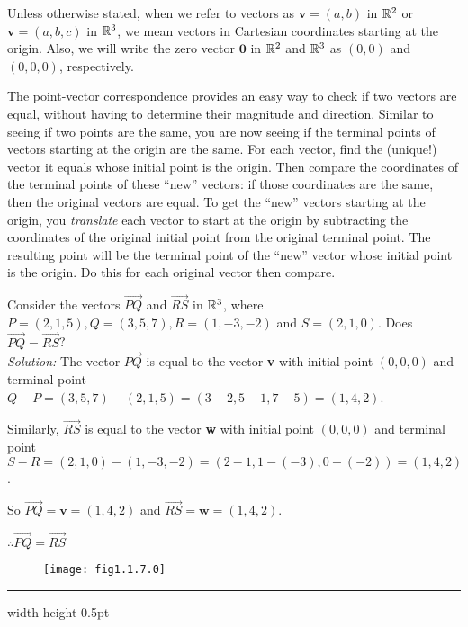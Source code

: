 Unless otherwise stated, when we refer to vectors as $\textbf{v} = (a,b)$ in $\mathbb{R}^{2}$ or $\textbf{v} = (a,b,c)$
in $\mathbb{R}^{3}$, we mean vectors in Cartesian coordinates starting at the origin.  Also, we will write
the zero vector $\textbf{0}$ in $\mathbb{R}^{2}$ and $\mathbb{R}^{3}$ as $(0,0)$ and $(0,0,0)$, respectively.

The point-vector correspondence provides an easy way to check if two vectors are
equal, without having to determine their magnitude and direction.  Similar to seeing if two points are the same, you are
now seeing if the terminal points of vectors starting at the origin are the same.  For each vector, find the
(unique!) vector it equals whose initial point is the origin.  Then compare the coordinates of the terminal points of
these ``new'' vectors: if those coordinates are the same, then the original vectors are equal.  To get the ``new''
vectors starting at the origin, you \emph{translate}
each vector to start at the origin by subtracting the coordinates of the original
initial point from the original terminal point.  The resulting point will be the terminal point of
the ``new'' vector whose initial point is the origin.  Do this for each original vector then compare.

\begin{exmp}
 Consider the vectors $\overrightarrow{PQ}$ and $\overrightarrow{RS}$ in $\mathbb{R}^{3}$, where $P = (2,1,5),
 Q = (3,5,7), R = (1,-3,-2)$ and $S = (2,1,0)$.  Does $\overrightarrow{PQ} =
 \overrightarrow{RS}$?\\\emph{Solution:}
 The vector $\overrightarrow{PQ}$ is equal to the vector \textbf{v} with
 initial point $(0,0,0)$ and terminal point $Q - P = (3,5,7) - (2,1,5) = (3 - 2,5 - 1,7 - 5) = (1,4,2)$.
 \par\noindent
 Similarly, $\overrightarrow{RS}$ is equal to the vector \textbf{w} with
 initial point $(0,0,0)$ and terminal point $S - R = (2,1,0) - (1,-3,-2) = (2 - 1, 1 - (-3),0 - (-2)) = (1,4,2)$.
 \par\noindent
 So $\overrightarrow{PQ} = \textbf{v} = (1,4,2)$ and $\overrightarrow{RS} = \textbf{w} = (1,4,2)$.
 \par\noindent
 $\therefore \overrightarrow{PQ} = \overrightarrow{RS}$
\end{exmp}
\begin{figure}[h]
 \begin{center}
  \texttt{[image: fig1.1.7.0]}
 \end{center}
 \caption[]{}
 \label{fig:ex1.2}
\end{figure}
\hrule width \textwidth height 0.5pt
\vspace{4mm}

